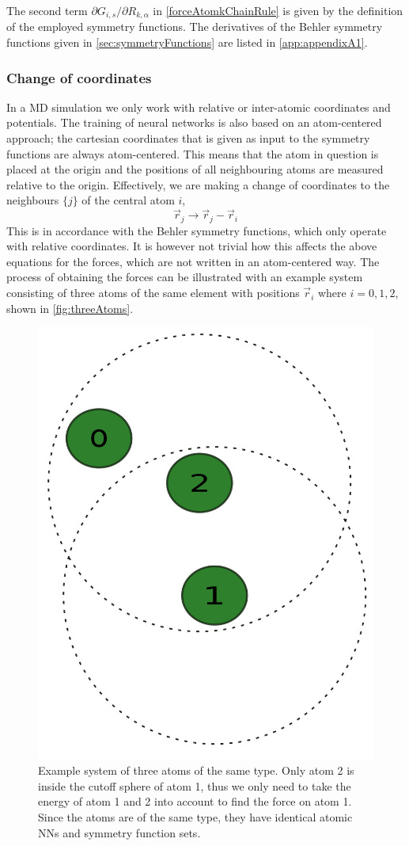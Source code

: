 \documentclass[twoside,english]{uiofysmaster}
\begin{document}
The second term $\partial G_{i,s}/\partial R_{k,\alpha}$ in \eqref{forceAtomkChainRule} is given by the 
definition of the employed symmetry functions. 
The derivatives of the Behler symmetry functions given in \autoref{sec:symmetryFunctions} are listed in \autoref{app:appendixA1}.

\subsubsection{Change of coordinates}
In a MD simulation we only work with relative or inter-atomic coordinates and potentials. 
The training of neural networks is also based on an atom-centered approach; the cartesian coordinates
that is given as input to the symmetry functions are always atom-centered. This means that the atom
in question is placed at the origin and the positions of all neighbouring atoms are measured relative to 
the origin. Effectively, we are making a change of coordinates to the neighbours $\{j\}$ of the central atom $i$,
\begin{equation}
 \vec{r}_j \rightarrow \vec{r}_j - \vec{r}_i
 \label{changeOfCoordinates}
\end{equation}
This is in accordance with the Behler symmetry functions, which only operate with relative coordinates. 
It is however not trivial how this affects the above equations for the forces, which are not written in 
an atom-centered way. The process of obtaining the forces can be illustrated with an example system
consisting of three atoms of the same element with positions $\vec{r}_i$ where $i = 0,1,2$, shown in \autoref{fig:threeAtoms}.
\begin{figure}[h]
\begin{center}
  \includegraphics[width = 0.4\linewidth]{Figures/Implementation/3atoms.pdf}
  \caption{Example system of three atoms of the same type. Only atom 2 is inside the cutoff sphere of atom 1, thus we only need to 
	   take the energy of atom 1 and 2 into account to find the force on atom 1. Since the atoms are of the same type,
	   they have identical atomic NNs and symmetry function sets.}
  \label{fig:threeAtoms}
  \end{center}
\end{figure}
\end{document}
